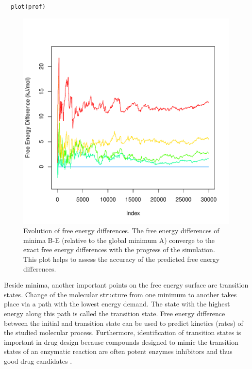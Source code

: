 \begin{verbatim}
  plot(prof)
\end{verbatim}

\begin{Schunk}
\begin{figure}

{\centering \includegraphics[width=0.8\linewidth]{metadynminer_files/figure-latex/conv-1} 

}

\caption[Evolution of free energy differences]{Evolution of free energy differences. The free energy differences of minima B-E (relative to the global minimum A) converge to the exact free energy differences with the progress of the simulation. This plot helps to assess the accuracy of the predicted free energy differences.}\label{fig:conv}
\end{figure}
\end{Schunk}

Beside minima, another important points on the free energy surface are
transition states. Change of the molecular structure from one minimum to
another takes place via a path with the lowest energy demand. The state
with the highest energy along this path is called the transition state.
Free energy difference between the initial and transition state can be
used to predict kinetics (rates) of the studied molecular process.
Furthermore, identification of transition states is important in drug
design because compounds designed to mimic the transition states of an
enzymatic reaction are often potent enzymes inhibitors and thus good
drug candidates \citep{relenza}.

